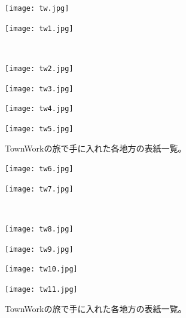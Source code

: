 \begin{figure}[htbp]
    \centering
  \begin{minipage}{0.4\linewidth}
    \centering
    \texttt{[image: tw.jpg]}
  \end{minipage}
  \begin{minipage}{0.4\linewidth}
    \centering
    \texttt{[image: tw1.jpg]}
  \end{minipage}\\
  \begin{minipage}{0.4\linewidth}
    \centering
    \texttt{[image: tw2.jpg]}
  \end{minipage}
  \begin{minipage}{0.4\linewidth}
    \centering
    \texttt{[image: tw3.jpg]}
  \end{minipage}
  \begin{minipage}{0.4\linewidth}
    \centering
    \texttt{[image: tw4.jpg]}
  \end{minipage}
  \begin{minipage}{0.4\linewidth}
    \centering
    \texttt{[image: tw5.jpg]}
  \end{minipage}
  \caption{TownWorkの旅で手に入れた各地方の表紙一覧。}
  \label{CscDetaDphi-CSide}
\end{figure}

\newpage
\begin{figure}[htbp]
    \centering
  \begin{minipage}{0.4\linewidth}
    \centering
    \texttt{[image: tw6.jpg]}
  \end{minipage}
  \begin{minipage}{0.4\linewidth}
    \centering
    \texttt{[image: tw7.jpg]}
  \end{minipage}\\
  \begin{minipage}{0.4\linewidth}
    \centering
    \texttt{[image: tw8.jpg]}
  \end{minipage}
  \begin{minipage}{0.4\linewidth}
    \centering
    \texttt{[image: tw9.jpg]}
  \end{minipage}
  \begin{minipage}{0.4\linewidth}
    \centering
    \texttt{[image: tw10.jpg]}
  \end{minipage}
  \begin{minipage}{0.4\linewidth}
    \centering
    \texttt{[image: tw11.jpg]}
  \end{minipage}
  \caption{TownWorkの旅で手に入れた各地方の表紙一覧。}
  \label{CscDetaDphi-CSide}
\end{figure}

